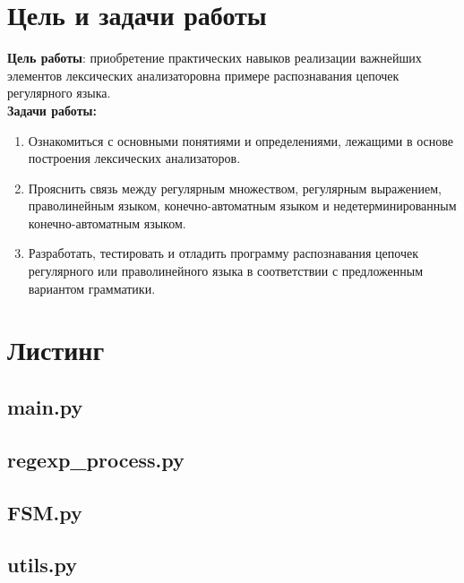 \newpage
	\section{Цель и задачи работы}
		\textbf{Цель работы}: приобретение практических навыков реализации важнейших элементов лексических анализаторовна
			примере распознавания цепочек регулярного языка.\\

		\textbf{Задачи работы:}
		\begin{enumerate}
			\item Ознакомиться с основными понятиями и определениями, лежащими в основе построения лексических анализаторов.
			\item Прояснить связь между регулярным множеством, регулярным выражением, праволинейным языком,
				конечно-автоматным языком и недетерминированным конечно-автоматным языком.
			\item Разработать, тестировать и отладить программу распознавания цепочек регулярного или
				праволинейного языка в соответствии с предложенным вариантом грамматики.
		\end{enumerate}


	\section{Листинг}
        
        
        \subsection{main.py}
        

        \subsection{regexp\_process.py}
        

        \subsection{FSM.py}
        

        \subsection{utils.py}
        

